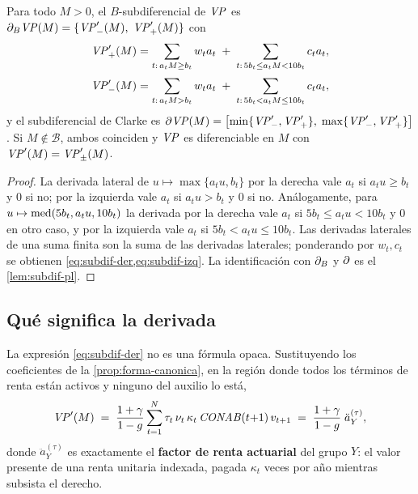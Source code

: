\begin{theorem}
\label{thm:subdiferencial}
Para todo $M>0$, el $B$-subdiferencial de $\mathit{VP}$ es
$\partial_B\mathit{VP}(M)=\{\mathit{VP}'_-(M),\;\mathit{VP}'_+(M)\}$ con
\begin{align}
  \mathit{VP}'_+(M) &= \sum_{t:\,a_tM\ge b_t} w_ta_t
             \;+\; \sum_{t:\,5b_t\le a_tM<10b_t} c_ta_t ,
  \label{eq:subdif-der}\\[2pt]
  \mathit{VP}'_-(M) &= \sum_{t:\,a_tM> b_t} w_ta_t
             \;+\; \sum_{t:\,5b_t< a_tM\le 10b_t} c_ta_t ,
  \label{eq:subdif-izq}
\end{align}
y el subdiferencial de Clarke es
$\partial\mathit{VP}(M)=\bigl[\min\{\mathit{VP}'_-,\mathit{VP}'_+\},\;\max\{\mathit{VP}'_-,\mathit{VP}'_+\}\bigr]$.
Si $M\notin\mathcal{B}$, ambos coinciden y $\mathit{VP}$ es diferenciable en $M$ con
$\mathit{VP}'(M)=\mathit{VP}'_\pm(M)$.
\end{theorem}
\begin{proof}
La derivada lateral de $u\mapsto\max\{a_tu,b_t\}$ por la derecha vale $a_t$ si
$a_tu\ge b_t$ y $0$ si no; por la izquierda vale $a_t$ si $a_tu>b_t$ y $0$ si no.
Análogamente, para $u\mapsto\operatorname{med}(5b_t,a_tu,10b_t)$ la derivada por la derecha vale
$a_t$ si $5b_t\le a_tu<10b_t$ y $0$ en otro caso, y por la izquierda vale $a_t$ si
$5b_t<a_tu\le10b_t$. Las derivadas laterales de una suma finita son la suma de las
derivadas laterales; ponderando por $w_t,c_t$ se obtienen
\cref{eq:subdif-der,eq:subdif-izq}. La identificación con $\partial_B$ y $\partial$ es el
\cref{lem:subdif-pl}.
\end{proof}

\subsection{Qué significa la derivada}
\label{sec:interpretacion-subdif}

La expresión \cref{eq:subdif-der} no es una fórmula opaca. Sustituyendo los
coeficientes de la \cref{prop:forma-canonica}, en la región donde todos los
términos de renta están activos y ninguno del auxilio lo está,
\begin{equation}
\label{eq:derivada-anualidad}
  \mathit{VP}'(M)\;=\;\frac{1+\gamma}{1-g}\sum_{t=1}^{N}
     \tau_t\,\nu_t\,\kappa_t\,\mathit{CONAB}(t{+}1)\,v_{t+1}
  \;=\;\frac{1+\gamma}{1-g}\;\ddot a^{(\tau)}_{Y},
\end{equation}
donde $\ddot a^{(\tau)}_{Y}$ es exactamente el \textbf{factor de renta actuarial}
del grupo $Y$: el valor presente de una renta unitaria indexada, pagada
$\kappa_t$ veces por año mientras subsista el derecho.

